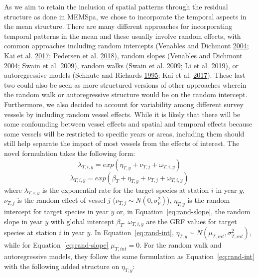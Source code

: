 \documentclass[12pt]{article}\usepackage[]{graphicx}\usepackage[]{color}
\begin{document}
As we aim to retain the inclusion of spatial patterns through the residual structure as done in MEMSpa, we chose to incorporate the temporal aspects in the mean structure. There are many different approaches for incorporating temporal patterns in the mean and these usually involve random effects, with common approaches including random intercepts (Venables and Dichmont \protect\hyperlink{ref-Venables2004}{2004}; Kai et al. \protect\hyperlink{ref-Kai2017}{2017}; Pedersen et al. \protect\hyperlink{ref-Pedersen2018}{2018}), random slopes (Venables and Dichmont \protect\hyperlink{ref-Venables2004}{2004}; Swain et al. \protect\hyperlink{ref-Swain2009}{2009}), random walks (Swain et al. \protect\hyperlink{ref-Swain2009}{2009}; Li et al. \protect\hyperlink{ref-Li2019}{2019}), or autoregressive models (Schnute and Richards \protect\hyperlink{ref-Schnute1995}{1995}; Kai et al. \protect\hyperlink{ref-Kai2017}{2017}). These last two could also be seen as more structured versions of other approaches wherein the random walk or autoregressive structure would be on the random intercept. Furthermore, we also decided to account for variability among different survey vessels by including random vessel effects. While it is likely that there will be some confounding between vessel effects and spatial and temporal effects because some vessels will be restricted to specific years or areas, including them should still help separate the impact of most vessels from the effects of interest. The novel formulation takes the following form:
\begin{equation}\label{eq:rand-int}
\lambda_{T,i,y} = exp(\eta_{T,y}+ \nu_{T,j}+\omega_{T,i,y})
\end{equation} \begin{equation}\label{eq:rand-slope}
\lambda_{T,i,y} = exp(\beta_T+\eta_{T,y}+ \nu_{T,j}+\omega_{T,i,y})
\end{equation}
where \(\lambda_{T,i,y}\) is the exponential rate for the target species at station \(i\) in year \(y\), \(\nu_{T,j}\) is the random effect of vessel \(j\) (\(\nu_{T,j} \sim N(0,\sigma_\nu^2)\)), \(\eta_{T,y}\) is the random intercept for target species in year \(y\) or, in Equation~\ref{eq:rand-slope}, the random slope in year \(y\) with global intercept \(\beta_T\). \(\omega_{T,i,y}\) are the GRF values for target species at station \(i\) in year \(y\). In Equation~\ref{eq:rand-int}, \(\eta_{T,y} \sim N(\mu_{T,int},\sigma_{T,int}^2)\), while for Equation~\ref{eq:rand-slope} \(\mu_{T,int}=0\). For the random walk and autoregressive models, they follow the same formulation as Equation~\ref{eq:rand-int} with the following added structure on \(\eta_{T,y}\):
\end{document}
